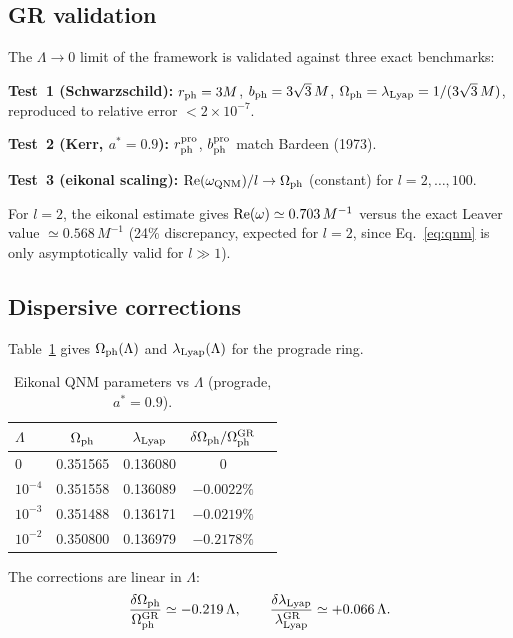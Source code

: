 \documentclass[12pt,a4paper]{article}
\newcommand{\Omph}{\Omega_{\rm ph}}
\newcommand{\lLyap}{\lambda_{\rm Lyap}}
\begin{document}
\subsection{GR validation}

The $\Lambda\to0$ limit of the framework is validated against three
exact benchmarks:

\textbf{Test~1 (Schwarzschild):}
$r_{\rm ph}=3M$, $b_{\rm ph}=3\sqrt{3}\,M$,
$\Omph=\lLyap=1/(3\sqrt{3}\,M)$,
reproduced to relative error $<2\times10^{-7}$. \checkmark

\textbf{Test~2 (Kerr, $a^*=0.9$):}
$r_{\rm ph}^{\rm pro}$, $b_{\rm ph}^{\rm pro}$ match Bardeen (1973). \checkmark

\textbf{Test~3 (eikonal scaling):}
${\rm Re}(\omega_{\rm QNM})/l\to\Omph$ (constant) for $l=2,\ldots,100$. \checkmark

For $l=2$, the eikonal estimate gives
${\rm Re}(\omega)\simeq 0.703\,M^{-1}$ versus the exact Leaver value
$\simeq 0.568\,M^{-1}$ \citep{Berti2009} (24\% discrepancy, expected for $l=2$,
since Eq.~\eqref{eq:qnm} is only asymptotically valid for $l\gg1$).

\subsection{Dispersive corrections}

Table~\ref{tab:qnm} gives $\Omph(\Lambda)$ and $\lLyap(\Lambda)$
for the prograde ring.

\begin{table}[h]
\centering
\caption{Eikonal QNM parameters vs $\Lambda$ (prograde, $a^*=0.9$).}
\label{tab:qnm}
\begin{tabular}{lcccl}
\toprule
$\Lambda$ & $\Omph$ & $\lLyap$ & $\delta\Omph/\Omph^{\rm GR}$ \\
\midrule
$0$       & 0.351565 & 0.136080 & $0$         \\
$10^{-4}$ & 0.351558 & 0.136089 & $-0.0022\%$ \\
$10^{-3}$ & 0.351488 & 0.136171 & $-0.0219\%$ \\
$10^{-2}$ & 0.350800 & 0.136979 & $-0.2178\%$ \\
\bottomrule
\end{tabular}
\end{table}

The corrections are linear in $\Lambda$:
\begin{equation}
  \frac{\delta\Omph}{\Omph^{\rm GR}} \simeq -0.219\,\Lambda,\qquad
  \frac{\delta\lLyap}{\lLyap^{\rm GR}} \simeq +0.066\,\Lambda.
\end{equation}
\end{document}
